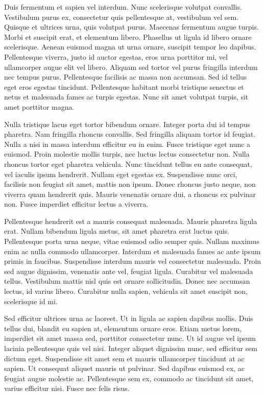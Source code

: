 Duis fermentum et sapien vel interdum. Nunc scelerisque volutpat convallis. Vestibulum purus ex, consectetur quis pellentesque at, vestibulum vel sem. Quisque et ultrices urna, quis volutpat purus. Maecenas fermentum augue turpis. Morbi et suscipit erat, et elementum libero. Phasellus ut ligula id libero ornare scelerisque. Aenean euismod magna ut urna ornare, suscipit tempor leo dapibus. Pellentesque viverra, justo id auctor egestas, eros urna porttitor mi, vel ullamcorper augue elit vel libero. Aliquam sed tortor vel purus fringilla interdum nec tempus purus. Pellentesque facilisis ac massa non accumsan. Sed id tellus eget eros egestas tincidunt. Pellentesque habitant morbi tristique senectus et netus et malesuada fames ac turpis egestas. Nunc sit amet volutpat turpis, sit amet porttitor magna.

Nulla tristique lacus eget tortor bibendum ornare. Integer porta dui id tempus pharetra. Nam fringilla rhoncus convallis. Sed fringilla aliquam tortor id feugiat. Nulla a nisi in massa interdum efficitur eu in enim. Fusce tristique eget nunc a euismod. Proin molestie mollis turpis, nec luctus lectus consectetur non. Nulla rhoncus tortor eget pharetra vehicula. Nunc tincidunt tellus eu ante consequat, vel iaculis ipsum hendrerit. Nullam eget egestas ex. Suspendisse nunc orci, facilisis non feugiat sit amet, mattis non ipsum. Donec rhoncus justo neque, non viverra quam hendrerit quis. Mauris venenatis ornare dui, a rhoncus ex pulvinar non. Fusce imperdiet efficitur lectus a viverra.

Pellentesque hendrerit est a mauris consequat malesuada. Mauris pharetra ligula erat. Nullam bibendum ligula metus, sit amet pharetra erat luctus quis. Pellentesque porta urna neque, vitae euismod odio semper quis. Nullam maximus enim ac nulla commodo ullamcorper. Interdum et malesuada fames ac ante ipsum primis in faucibus. Suspendisse interdum mauris vel consectetur malesuada. Proin sed augue dignissim, venenatis ante vel, feugiat ligula. Curabitur vel malesuada tellus. Vestibulum mattis nisl quis est ornare sollicitudin. Donec nec accumsan lectus, id varius libero. Curabitur nulla sapien, vehicula sit amet suscipit non, scelerisque id mi.

Sed efficitur ultrices urna ac laoreet. Ut in ligula ac sapien dapibus mollis. Duis tellus dui, blandit eu sapien at, elementum ornare eros. Etiam metus lorem, imperdiet sit amet massa sed, porttitor consectetur nunc. Ut id augue vel ipsum lacinia pellentesque quis vel nisi. Integer aliquet dignissim nunc, sed efficitur sem dictum eget. Suspendisse sit amet sem et mauris ullamcorper tincidunt at ac sapien. Ut consequat aliquet mauris ut pulvinar. Sed dapibus euismod ex, ac feugiat augue molestie ac. Pellentesque sem ex, commodo ac tincidunt sit amet, varius efficitur nisi. Fusce nec felis risus.

